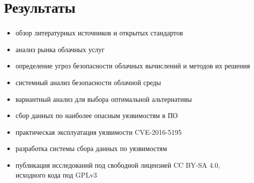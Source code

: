 
\section{Результаты}

\begin{frame}
\frametitle{\insertsection}

\begin{itemize}
    \item обзор литературных источников и открытых стандартов
    \item анализ рынка облачных услуг
    \item определение угроз безопасности облачных вычислений и методов их решения
    \item системный анализ безопасности облачной среды
    \item вариантный анализ для выбора оптимальной альтернативы
    \item сбор данных по наиболее опасным уязвимостям в ПО
    \item практическая эксплуатация уязвимости CVE-2016-5195
    \item разработка системы сбора данных по уязвимостям
    \item публикация исследований под свободной лицензией CC BY-SA 4.0, исходного кода под GPLv3
\end{itemize}
\end{frame}


